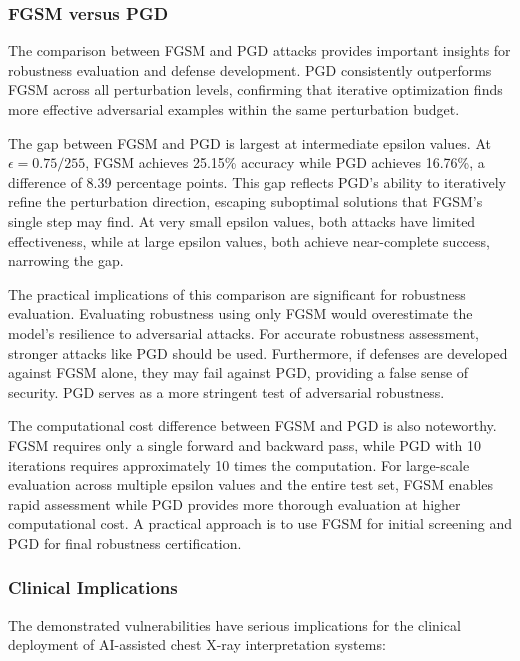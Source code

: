 \documentclass[12pt,a4paper]{article}
\begin{document}
\subsubsection{FGSM versus PGD}

The comparison between FGSM and PGD attacks provides important insights for robustness evaluation and defense development. PGD consistently outperforms FGSM across all perturbation levels, confirming that iterative optimization finds more effective adversarial examples within the same perturbation budget.

The gap between FGSM and PGD is largest at intermediate epsilon values. At $\epsilon=0.75/255$, FGSM achieves 25.15\% accuracy while PGD achieves 16.76\%, a difference of 8.39 percentage points. This gap reflects PGD's ability to iteratively refine the perturbation direction, escaping suboptimal solutions that FGSM's single step may find. At very small epsilon values, both attacks have limited effectiveness, while at large epsilon values, both achieve near-complete success, narrowing the gap.
    
The practical implications of this comparison are significant for robustness evaluation. Evaluating robustness using only FGSM would overestimate the model's resilience to adversarial attacks. For accurate robustness assessment, stronger attacks like PGD should be used. Furthermore, if defenses are developed against FGSM alone, they may fail against PGD, providing a false sense of security. PGD serves as a more stringent test of adversarial robustness.
    
The computational cost difference between FGSM and PGD is also noteworthy. FGSM requires only a single forward and backward pass, while PGD with 10 iterations requires approximately 10 times the computation. For large-scale evaluation across multiple epsilon values and the entire test set, FGSM enables rapid assessment while PGD provides more thorough evaluation at higher computational cost. A practical approach is to use FGSM for initial screening and PGD for final robustness certification.
    
\subsubsection{Clinical Implications}
    
The demonstrated vulnerabilities have serious implications for the clinical deployment of AI-assisted chest X-ray interpretation systems:
\end{document}
